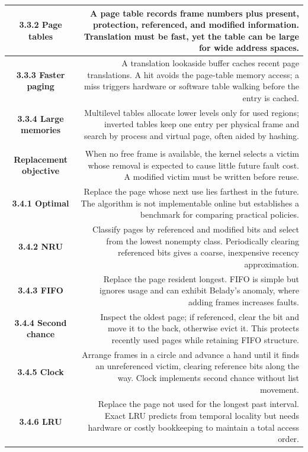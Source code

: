 \documentclass[10pt,letterpaper]{article}
\begin{document}
\begin{longtable}{C N}
\textbf{3.3.2 Page tables} & A page table records frame numbers plus present, protection, referenced, and modified information. Translation must be fast, yet the table can be large for wide address spaces.\\\hline
\textbf{3.3.3 Faster paging} & A translation lookaside buffer caches recent page translations. A hit avoids the page-table memory access; a miss triggers hardware or software table walking before the entry is cached.\\\hline
\textbf{3.3.4 Large memories} & Multilevel tables allocate lower levels only for used regions; inverted tables keep one entry per physical frame and search by process and virtual page, often aided by hashing.\\\hline
{}\\*\hline
\textbf{Replacement objective} & When no free frame is available, the kernel selects a victim whose removal is expected to cause little future fault cost. A modified victim must be written before reuse.\\\hline
\textbf{3.4.1 Optimal} & Replace the page whose next use lies farthest in the future. The algorithm is not implementable online but establishes a benchmark for comparing practical policies.\\\hline
\textbf{3.4.2 NRU} & Classify pages by referenced and modified bits and select from the lowest nonempty class. Periodically clearing referenced bits gives a coarse, inexpensive recency approximation.\\\hline
\textbf{3.4.3 FIFO} & Replace the page resident longest. FIFO is simple but ignores usage and can exhibit Belady's anomaly, where adding frames increases faults.\\\hline
\textbf{3.4.4 Second chance} & Inspect the oldest page; if referenced, clear the bit and move it to the back, otherwise evict it. This protects recently used pages while retaining FIFO structure.\\\hline
\textbf{3.4.5 Clock} & Arrange frames in a circle and advance a hand until it finds an unreferenced victim, clearing reference bits along the way. Clock implements second chance without list movement.\\\hline
\textbf{3.4.6 LRU} & Replace the page not used for the longest past interval. Exact LRU predicts from temporal locality but needs hardware or costly bookkeeping to maintain a total access order.\\\hline

\end{longtable}
\end{document}
